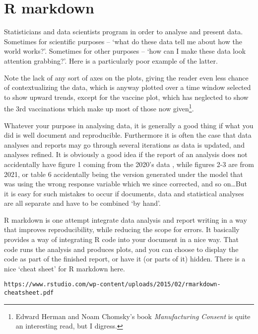 \documentclass[10pt] {article}
\newcommand{\eps}[3]
{{\begin{center}
 \rotatebox{#1}{\scalebox{#2}{\texttt{[image: \#3]}}}
 \end{center}}
}
\theoremstyle{definition}
\begin{document}
\begin{lstlisting}

\end{lstlisting}

\begin{lstlisting}

\end{lstlisting}

\section{R markdown}

Statisticians and data scientists program in order to analyse and present data. Sometimes for scientific purposes -- `what do these data tell me about how the world works?'. Sometimes for other purposes -- `how can I make these data look attention grabbing?'. Here is a particularly poor example of the latter. 
\eps{0}{.2}{BBC2021-10-25}
Note the lack of any sort of axes on the plots, giving the reader even less chance of contextualizing the data, which is anyway plotted over a time window selected to show upward trends, except for the vaccine plot, which has neglected to show the 3rd vaccinations which make up most of those now given\footnote{Edward Herman and Noam Chomsky's book {\em Manufacturing Consent} is quite an interesting read, but I digress.}.   

Whatever your purpose in analysing data, it is generally a good thing if what you did is well document and reproducible. Furthermore it is often the case that data analyses and reports may go through several iterations as data is updated, and analyses refined. It is obviously a good idea if the report of an analysis does not accidentally have figure 1 coming from the 2020's data , while figures 2-3 are from 2021, or table 6 accidentally being the version generated under the model that was using the wrong response variable which we since corrected, and so on\ldots But it is easy for such mistakes to occur if documents, data and statistical analyses are all separate and have to be combined `by hand'. 

R markdown is one attempt integrate data analysis and report writing in a way that improves reproducibility, while reducing the scope for errors. It basically provides a way of integrating R code into your document in a nice way. That code runs the analysis and produces plots, and you can choose to display the code as part of the finished report, or have it (or parts of it) hidden. There is a nice `cheat sheet' for R markdown here.
\begin{lstlisting}
https://www.rstudio.com/wp-content/uploads/2015/02/rmarkdown-cheatsheet.pdf
\end{lstlisting}


\printindex
\end{document}
